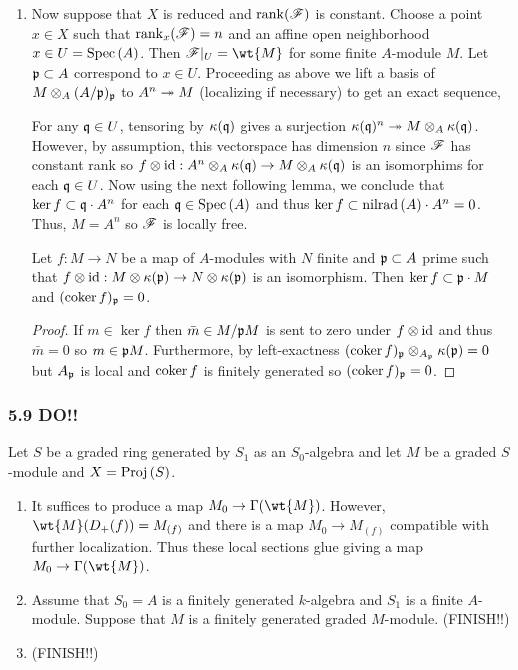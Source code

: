 \documentclass[12pt]{article}
\begin{document}
\begin{enumerate}
\item Now suppose that $X$ is reduced and $\mathrm{rank}(\mathscr{F})$ is constant. Choose a point $x \in X$ such that $\mathrm{rank}_x(\mathscr{F}) = n$ and an affine open neighborhood $x \in U = \mathrm{Spec}\left( A \right)$. Then $\F|_U = \wt{M}$ for some finite $A$-module $M$. Let $\mathfrak{p} \subset A$ correspond to $x \in U$. Proceeding as above we lift a basis of $M \otimes_A (A/\mathfrak{p})_{\mathfrak{p}}$ to $A^n \twoheadrightarrow M$ (localizing if necessary) to get an exact sequence,
\begin{center}
\end{center}
For any $\mathfrak{q} \in U$, tensoring by $\kappa(\mathfrak{q})$ gives a surjection $\kappa(\mathfrak{q})^n \twoheadrightarrow M \otimes_{A} \kappa(\mathfrak{q})$. However, by assumption, this vectorspace has dimension $n$ since $\mathscr{F}$ has constant rank so $f \otimes \mathrm{id} : A^n \otimes_{A} \kappa(\mathfrak{q}) \to M \otimes_{A} \kappa(\mathfrak{q})$ is an isomorphims for each $\mathfrak{q} \in U$. 
Now using the next following lemma, we conclude that $\ker{f} \subset \mathfrak{q} \cdot A^n$ for each $\mathfrak{q} \in \mathrm{Spec}\left( A \right)$ and thus $\ker{f} \subset \mathrm{nilrad}\left( A \right) \cdot A^n = 0$. Thus, $M = A^n$ so $\mathscr{F}$ is locally free.

\begin{lemma}
Let $f : M \to N$ be a map of $A$-modules with $N$ finite and $\mathfrak{p} \subset A$ prime such that $f \otimes \mathrm{id} : M \otimes \kappa(\mathfrak{p}) \to N \otimes \kappa(\mathfrak{p})$ is an isomorphism. Then $\ker{f} \subset \mathfrak{p} \cdot M$ and $(\operatorname{\mathrm{coker}}{f})_{\mathfrak{p}} = 0$.
\end{lemma}

\begin{proof}
If $m \in \ker{f}$ then $\bar{m} \in M/\mathfrak{p} M$ is sent to zero under $f \otimes \mathrm{id}$ and thus $\bar{m} = 0$ so $m \in \mathfrak{p} M$. Furthermore, by left-exactness $(\operatorname{\mathrm{coker}}{f})_{\mathfrak{p}} \otimes_{A_{\mathfrak{p}}} \kappa(\mathfrak{p}) = 0$ but $A_{\mathfrak{p}}$ is local and $\operatorname{\mathrm{coker}}{f}$ is finitely generated so $(\operatorname{\mathrm{coker}}{f})_{\mathfrak{p}} = 0$. 
\end{proof}
\end{enumerate}

\subsubsection{5.9 DO!!} 

Let $S$ be a graded ring generated by $S_1$ as an $S_0$-algebra and let $M$ be a graded $S$-module and $X = \mathrm{Proj}\left( S \right)$.

\begin{enumerate}
\item It suffices to produce a map $M_0 \to \Gamma(\wt{M})$. However, $\wt{M}(D_{+}(f)) = M_{(f)}$ and there is a map $M_0 \to M_{(f)}$ compatible with further localization. Thus these local sections glue giving a map $M_0 \to \Gamma(\wt{M})$.
\item Assume that $S_0 = A$ is a finitely generated $k$-algebra and $S_1$ is a finite $A$-module. Suppose that $M$ is a finitely generated graded $M$-module. (FINISH!!)

\item (FINISH!!)
\end{enumerate}
\end{document}
